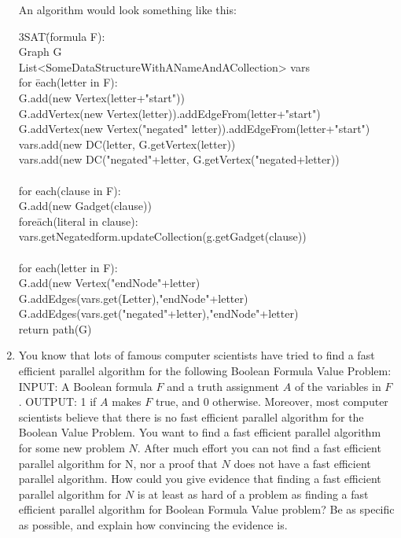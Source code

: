 \documentclass{article}
\begin{document}
\begin{enumerate}
An algorithm would look something like this:
\begin{tabbing}
3SAT\=(formula F):\\
\>Graph G\\
\>List<SomeDataStructureWithANameAndACollection> vars\\
\>for \=each(letter in F): \\
\>\>G.add(new Vertex(letter+"start"))\\
\>\>G.addVertex(new Vertex(letter)).addEdgeFrom(letter+"start")\\
\>\>G.addVertex(new Vertex("negated" letter)).addEdgeFrom(letter+"start")\\
\>\>vars.add(new DC(letter, G.getVertex(letter))\\
\>\>vars.add(new DC("negated"+letter, G.getVertex("negated+letter))\\
\\
\>for each(clause in F):\\
\>\>G.add(new Gadget(clause))\\
\>\>fore\=ach(literal in clause):\\
\>\>\>vars.getNegatedform.updateCollection(g.getGadget(clause))\\
\\
\>for each(letter in F):\\
\>\>G.add(new Vertex("endNode"+letter)\\
\>\>G.addEdges(vars.get(Letter),"endNode"+letter)\\
\>\>G.addEdges(vars.get("negated"+letter),"endNode"+letter)\\

\>return path(G)
\end{tabbing}

\setcounter{enumi}{1}
\item You know that lots of famous computer scientists have tried to find a fast efficient parallel algorithm
\newline for the following Boolean Formula Value Problem:
\newline INPUT: A Boolean formula $F$ and a truth assignment $A$ of the variables in $F$ .
\newline OUTPUT: 1 if $A$ makes $F$ true, and 0 otherwise.
\newline Moreover, most computer scientists believe that there is no fast efficient parallel algorithm for the
\newline Boolean Value Problem. You want to find a fast efficient parallel algorithm for some new problem $N$.
\newline After much effort you can not find a fast efficient parallel algorithm for N, nor a proof that $N$ does
\newline not have a fast efficient parallel algorithm. How could you give evidence that finding a fast efficient
\newline parallel algorithm for $N$ is at least as hard of a problem as finding a fast efficient parallel algorithm for
\newline Boolean Formula Value problem? Be as specific as possible, and explain how convincing the evidence
\newline is.
\newline


\end{enumerate}
\end{document}

